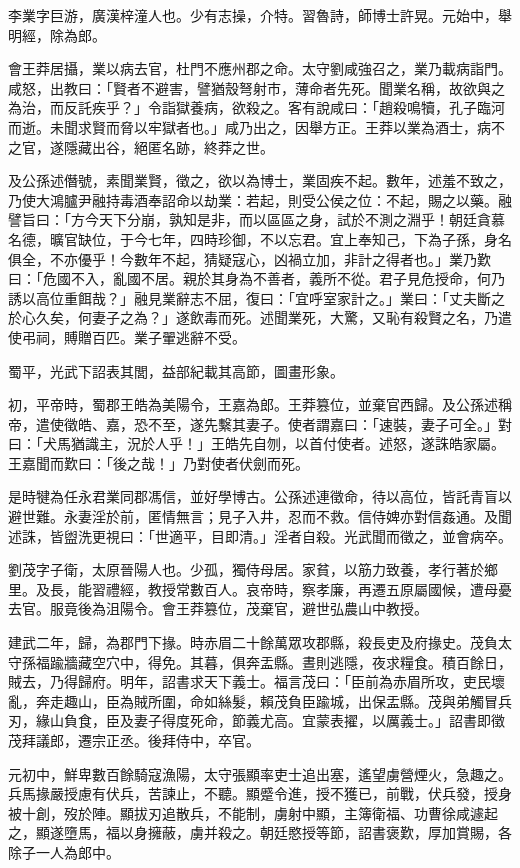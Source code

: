 \begin{pinyinscope}
李業字巨游，廣漢梓潼人也。少有志操，介特。習魯詩，師博士許晃。元始中，舉明經，除為郎。

會王莽居攝，業以病去官，杜門不應州郡之命。太守劉咸強召之，業乃載病詣門。咸怒，出教曰：「賢者不避害，譬猶殼弩射市，薄命者先死。聞業名稱，故欲與之為治，而反託疾乎？」令詣獄養病，欲殺之。客有說咸曰：「趙殺鳴犢，孔子臨河而逝。未聞求賢而脅以牢獄者也。」咸乃出之，因舉方正。王莽以業為酒士，病不之官，遂隱藏出谷，絕匿名跡，終莽之世。

及公孫述僭號，素聞業賢，徵之，欲以為博士，業固疾不起。數年，述羞不致之，乃使大鴻臚尹融持毒酒奉詔命以劫業：若起，則受公侯之位：不起，賜之以藥。融譬旨曰：「方今天下分崩，孰知是非，而以區區之身，試於不測之淵乎！朝廷貪慕名德，曠官缺位，于今七年，四時珍御，不以忘君。宜上奉知己，下為子孫，身名俱全，不亦優乎！今數年不起，猜疑寇心，凶禍立加，非計之得者也。」業乃歎曰：「危國不入，亂國不居。親於其身為不善者，義所不從。君子見危授命，何乃誘以高位重餌哉？」融見業辭志不屈，復曰：「宜呼室家計之。」業曰：「丈夫斷之於心久矣，何妻子之為？」遂飲毒而死。述聞業死，大驚，又恥有殺賢之名，乃遣使弔祠，賻贈百匹。業子翬逃辭不受。

蜀平，光武下詔表其閭，益部紀載其高節，圖畫形象。

初，平帝時，蜀郡王皓為美陽令，王嘉為郎。王莽篡位，並棄官西歸。及公孫述稱帝，遣使徵皓、嘉，恐不至，遂先繫其妻子。使者謂嘉曰：「速裝，妻子可全。」對曰：「犬馬猶識主，況於人乎！」王皓先自刎，以首付使者。述怒，遂誅皓家屬。王嘉聞而歎曰：「後之哉！」乃對使者伏劍而死。

是時犍為任永君業同郡馮信，並好學博古。公孫述連徵命，待以高位，皆託青盲以避世難。永妻淫於前，匿情無言；見子入井，忍而不救。信侍婢亦對信姦通。及聞述誅，皆盥洗更視曰：「世適平，目即清。」淫者自殺。光武聞而徵之，並會病卒。

劉茂字子衛，太原晉陽人也。少孤，獨侍母居。家貧，以筋力致養，孝行著於鄉里。及長，能習禮經，教授常數百人。哀帝時，察孝廉，再遷五原屬國候，遭母憂去官。服竟後為沮陽令。會王莽篡位，茂棄官，避世弘農山中教授。

建武二年，歸，為郡門下掾。時赤眉二十餘萬眾攻郡縣，殺長吏及府掾史。茂負太守孫福踰牆藏空穴中，得免。其暮，俱奔盂縣。晝則逃隱，夜求糧食。積百餘日，賊去，乃得歸府。明年，詔書求天下義士。福言茂曰：「臣前為赤眉所攻，吏民壞亂，奔走趣山，臣為賊所圍，命如絲髮，賴茂負臣踰城，出保盂縣。茂與弟觸冒兵刃，緣山負食，臣及妻子得度死命，節義尤高。宜蒙表擢，以厲義士。」詔書即徵茂拜議郎，遷宗正丞。後拜侍中，卒官。

元初中，鮮卑數百餘騎寇漁陽，太守張顯率吏士追出塞，遙望虜營煙火，急趣之。兵馬掾嚴授慮有伏兵，苦諫止，不聽。顯蹙令進，授不獲已，前戰，伏兵發，授身被十創，歿於陣。顯拔刃追散兵，不能制，虜射中顯，主簿衛福、功曹徐咸遽起之，顯遂墮馬，福以身擁蔽，虜并殺之。朝廷愍授等節，詔書褒歎，厚加賞賜，各除子一人為郎中。


\end{pinyinscope}
